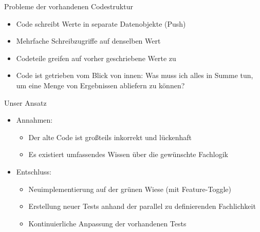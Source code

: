 \begin{frame}[fragile]{Probleme der vorhandenen Codestruktur}
\begin{itemize}
\item Code schreibt Werte in separate Datenobjekte (\glqq Push\grqq{})
\item Mehrfache Schreibzugriffe auf denselben Wert
\item Codeteile greifen auf vorher geschriebene Werte zu
\item Code ist getrieben vom Blick von innen: Was muss ich alles in Summe tun, um eine Menge von Ergebnissen abliefern zu können?
\end{itemize}
\end{frame}



\begin{frame}[fragile]{Unser Ansatz}
\begin{itemize}
\item Annahmen:
\begin{itemize}
\item Der alte Code ist großteils inkorrekt und lückenhaft
\item Es existiert umfassendes Wissen über die gewünschte Fachlogik
\end{itemize}
\end{itemize}

\begin{itemize}
\item Entschluss:
\begin{itemize}
\item Neuimplementierung auf der grünen Wiese (mit Feature-Toggle)
\item Erstellung neuer Tests anhand der parallel zu definierenden Fachlichkeit
\item Kontinuierliche Anpassung der vorhandenen Tests
\end{itemize}
\end{itemize}

\end{frame}


